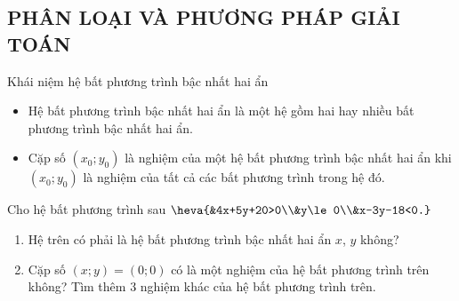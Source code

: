 \subsection{PHÂN LOẠI VÀ PHƯƠNG PHÁP GIẢI TOÁN}
\begin{dang}{Khái niệm hệ bất phương trình bậc nhất hai ẩn}
	\begin{itemize}
		\item Hệ bất phương trình bậc nhất hai ẩn là một hệ gồm hai hay nhiều bất phương trình bậc nhất hai ẩn.
		\item Cặp số $ (x_0;y_0) $ là nghiệm của một hệ bất phương trình bậc nhất hai ẩn khi $ (x_0;y_0) $ là nghiệm của tất cả các bất phương trình trong hệ đó.
	\end{itemize}
\end{dang}
\begin{vd}%
	Cho hệ bất phương trình sau $\heva{&4x+5y+20>0\\&y\le 0\\&x-3y-18<0.}$
	\begin{enumerate}
		\item Hệ trên có phải là hệ bất phương trình bậc nhất hai ẩn $x$, $y$ không?
		\item Cặp số $ (x;y)=(0;0) $ có là một nghiệm của hệ bất phương trình trên không? Tìm thêm $3$ nghiệm khác của hệ bất phương trình trên.
	\end{enumerate}
\end{vd}
